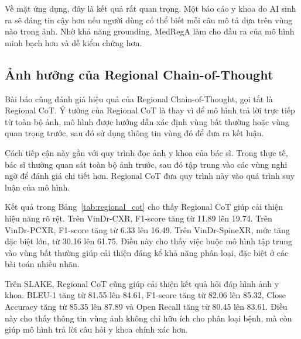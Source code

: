 \documentclass[12pt,a4paper,oneside]{extarticle}
\begin{document}
Về mặt ứng dụng, đây là kết quả rất quan trọng. Một báo cáo y khoa do AI sinh ra sẽ đáng tin cậy hơn nếu người dùng có thể biết mỗi câu mô tả dựa trên vùng nào trong ảnh. Nhờ khả năng grounding, MedRegA làm cho đầu ra của mô hình minh bạch hơn và dễ kiểm chứng hơn.

\subsection{Ảnh hưởng của Regional Chain-of-Thought}

Bài báo cũng đánh giá hiệu quả của Regional Chain-of-Thought, gọi tắt là Regional CoT. Ý tưởng của Regional CoT là thay vì để mô hình trả lời trực tiếp từ toàn bộ ảnh, mô hình được hướng dẫn xác định vùng bất thường hoặc vùng quan trọng trước, sau đó sử dụng thông tin vùng đó để đưa ra kết luận.

Cách tiếp cận này gần với quy trình đọc ảnh y khoa của bác sĩ. Trong thực tế, bác sĩ thường quan sát toàn bộ ảnh trước, sau đó tập trung vào các vùng nghi ngờ để đánh giá chi tiết hơn. Regional CoT đưa quy trình này vào quá trình suy luận của mô hình.

Kết quả trong Bảng~\ref{tab:regional_cot} cho thấy Regional CoT giúp cải thiện hiệu năng rõ rệt. Trên VinDr-CXR, F1-score tăng từ 11.89 lên 19.74. Trên VinDr-PCXR, F1-score tăng từ 6.33 lên 16.49. Trên VinDr-SpineXR, mức tăng đặc biệt lớn, từ 30.16 lên 61.75. Điều này cho thấy việc buộc mô hình tập trung vào vùng bất thường giúp cải thiện đáng kể khả năng phân loại, đặc biệt ở các bài toán nhiều nhãn.

Trên SLAKE, Regional CoT cũng giúp cải thiện kết quả hỏi đáp hình ảnh y khoa. BLEU-1 tăng từ 81.55 lên 84.61, F1-score tăng từ 82.06 lên 85.32, Close Accuracy tăng từ 85.35 lên 87.89 và Open Recall tăng từ 80.45 lên 83.61. Điều này cho thấy thông tin vùng ảnh không chỉ hữu ích cho phân loại bệnh, mà còn giúp mô hình trả lời câu hỏi y khoa chính xác hơn.

\begin{table}[htbp]
\centering
\caption{Ảnh hưởng của Regional Chain-of-Thought}
\label{tab:regional_cot}
\end{table}
\end{document}
